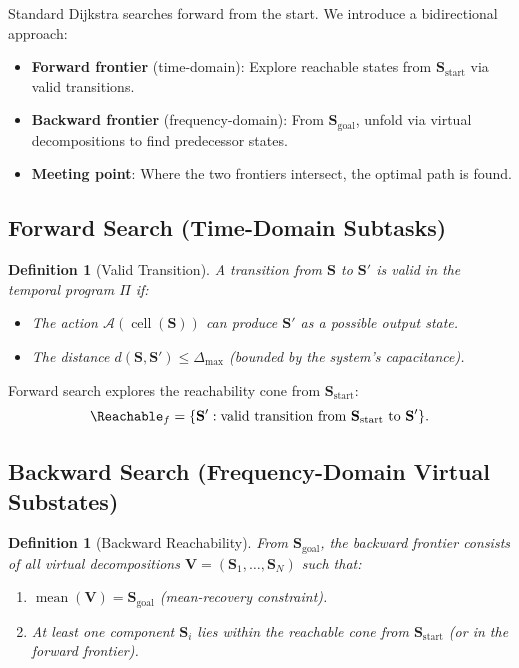 \documentclass[twocolumn,11pt,a4paper]{article}
\newtheorem{definition}[theorem]{Definition}
\newcommand{\Stuple}{\mathbf{S}}
\DeclareMathOperator{\cell}{cell}
\DeclareMathOperator{\mean}{mean}
\begin{document}
Standard Dijkstra searches forward from the start. We introduce a bidirectional approach:

\begin{itemize}[nosep,leftmargin=1em]
  \item \textbf{Forward frontier} (time-domain): Explore reachable states from $\Stuple_{\text{start}}$ via valid transitions.
  \item \textbf{Backward frontier} (frequency-domain): From $\Stuple_{\text{goal}}$, unfold via virtual decompositions to find predecessor states.
  \item \textbf{Meeting point}: Where the two frontiers intersect, the optimal path is found.
\end{itemize}

\subsection{Forward Search (Time-Domain Subtasks)}

\begin{definition}[Valid Transition]
A transition from $\Stuple$ to $\Stuple'$ is \emph{valid} in the temporal program $\Pi$ if:
\begin{itemize}[nosep,leftmargin=1em]
  \item The action $\mathcal{A}(\cell(\Stuple))$ can produce $\Stuple'$ as a possible output state.
  \item The distance $d(\Stuple, \Stuple') \leq \Delta_{\max}$ (bounded by the system's capacitance).
\end{itemize}
\end{definition}

Forward search explores the reachability cone from $\Stuple_{\text{start}}$:
\begin{equation}
  \Reachable_f = \{\Stuple' : \text{valid transition from } \Stuple_{\text{start}} \text{ to } \Stuple'\}.
\end{equation}

\subsection{Backward Search (Frequency-Domain Virtual Substates)}

\begin{definition}[Backward Reachability]
From $\Stuple_{\text{goal}}$, the backward frontier consists of all virtual decompositions $\mathbf{V} = (\Stuple_1, \ldots, \Stuple_N)$ such that:
\begin{enumerate}[nosep,label=(\roman*)]
  \item $\mean(\mathbf{V}) = \Stuple_{\text{goal}}$ (mean-recovery constraint).
  \item At least one component $\Stuple_i$ lies within the reachable cone from $\Stuple_{\text{start}}$ (or in the forward frontier).
\end{enumerate}
\end{definition}
\end{document}
